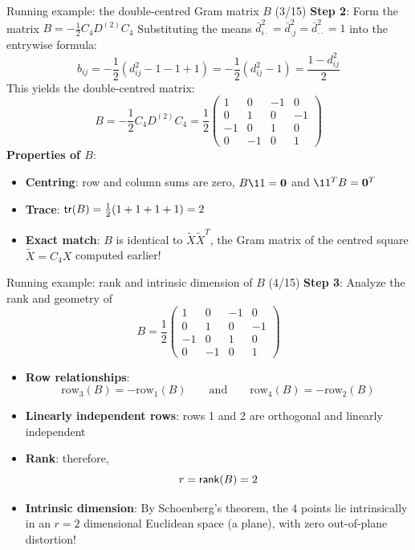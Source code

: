 \documentclass[aspectratio=169]{beamer}\usepackage[]{graphicx}\usepackage[]{xcolor}
\begin{document}
\begin{frame}{Running example: the double-centred Gram matrix $B$ (3/15)}
\textbf{Step 2}: Form the matrix $B = -\frac{1}{2} C_4 D^{(2)} C_4$
\vfill
Substituting the means $\bar{d}_{i\cdot}^2 = \bar{d}_{\cdot j}^2 = \bar{d}_{\cdot\cdot}^2 = 1$ into the entrywise formula:
\[
b_{ij} = -\frac{1}{2}\left(d_{ij}^2 - 1 - 1 + 1\right) = -\frac{1}{2}\left(d_{ij}^2 - 1\right) = \frac{1 - d_{ij}^2}{2}
\]
\vfill
This yields the double-centred matrix:
\[
B = -\frac{1}{2} C_4 D^{(2)} C_4 = \frac{1}{2}\begin{pmatrix}
1 & 0 & -1 & 0 \\
0 & 1 & 0 & -1 \\
-1 & 0 & 1 & 0 \\
0 & -1 & 0 & 1
\end{pmatrix}
\]
\vfill
\textbf{Properties of $B$}:
\begin{itemize}
\item \textbf{Centring}: row and column sums are zero, $B\11 = \b0$ and $\11^T B = \b0^T$
\item \textbf{Trace}: $\mathsf{tr}(B) = \frac{1}{2}(1 + 1 + 1 + 1) = 2$
\item \textbf{Exact match}: $B$ is identical to $\widetilde{X}\widetilde{X}^T$, the Gram matrix of the centred square $\widetilde{X} = C_4 X$ computed earlier!
\end{itemize}
\end{frame}

\begin{frame}{Running example: rank and intrinsic dimension of $B$ (4/15)}
\textbf{Step 3}: Analyze the rank and geometry of
\[
B = \frac{1}{2}\begin{pmatrix}
1 & 0 & -1 & 0 \\
0 & 1 & 0 & -1 \\
-1 & 0 & 1 & 0 \\
0 & -1 & 0 & 1
\end{pmatrix}
\]
\vfill
\begin{itemize}
\item \textbf{Row relationships}:
\[
\text{row}_3(B) = -\text{row}_1(B) \qquad\text{and}\qquad \text{row}_4(B) = -\text{row}_2(B)
\]
\item \textbf{Linearly independent rows}: rows 1 and 2 are orthogonal and linearly independent
\vfill
\item \textbf{Rank}: therefore,
\[
r = \mathsf{rank}(B) = 2
\]
\vfill
\item \textbf{Intrinsic dimension}: By Schoenberg's theorem, the $4$ points lie intrinsically in an $r = 2$ dimensional Euclidean space (a plane), with zero out-of-plane distortion!
\end{itemize}
\end{frame}
\end{document}
